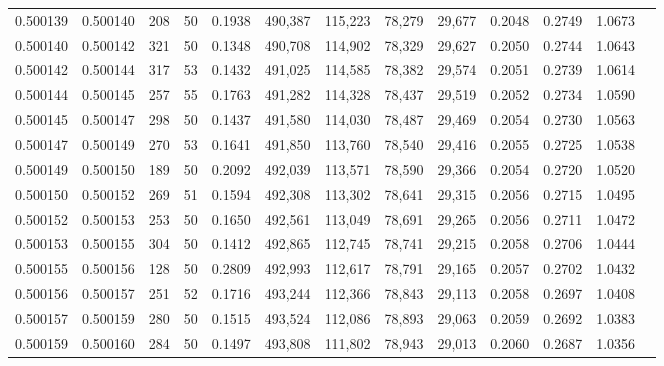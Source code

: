 \begin{tabular}{rrrrrrrrrrrrr}
0.500139 & 0.500140 & 208 &  50 &                                     0.1938 & 490,387 & 115,223 &  78,279 &  29,677 & 0.2048 & 0.2749 & 1.0673 \\
0.500140 & 0.500142 & 321 &  50 &                                     0.1348 & 490,708 & 114,902 &  78,329 &  29,627 & 0.2050 & 0.2744 & 1.0643 \\
0.500142 & 0.500144 & 317 &  53 &                                     0.1432 & 491,025 & 114,585 &  78,382 &  29,574 & 0.2051 & 0.2739 & 1.0614 \\
0.500144 & 0.500145 & 257 &  55 &                                     0.1763 & 491,282 & 114,328 &  78,437 &  29,519 & 0.2052 & 0.2734 & 1.0590 \\
0.500145 & 0.500147 & 298 &  50 &                                     0.1437 & 491,580 & 114,030 &  78,487 &  29,469 & 0.2054 & 0.2730 & 1.0563 \\
0.500147 & 0.500149 & 270 &  53 &                                     0.1641 & 491,850 & 113,760 &  78,540 &  29,416 & 0.2055 & 0.2725 & 1.0538 \\
0.500149 & 0.500150 & 189 &  50 &                                     0.2092 & 492,039 & 113,571 &  78,590 &  29,366 & 0.2054 & 0.2720 & 1.0520 \\
0.500150 & 0.500152 & 269 &  51 &                                     0.1594 & 492,308 & 113,302 &  78,641 &  29,315 & 0.2056 & 0.2715 & 1.0495 \\
0.500152 & 0.500153 & 253 &  50 &                                     0.1650 & 492,561 & 113,049 &  78,691 &  29,265 & 0.2056 & 0.2711 & 1.0472 \\
0.500153 & 0.500155 & 304 &  50 &                                     0.1412 & 492,865 & 112,745 &  78,741 &  29,215 & 0.2058 & 0.2706 & 1.0444 \\
0.500155 & 0.500156 & 128 &  50 &                                     0.2809 & 492,993 & 112,617 &  78,791 &  29,165 & 0.2057 & 0.2702 & 1.0432 \\
0.500156 & 0.500157 & 251 &  52 &                                     0.1716 & 493,244 & 112,366 &  78,843 &  29,113 & 0.2058 & 0.2697 & 1.0408 \\
0.500157 & 0.500159 & 280 &  50 &                                     0.1515 & 493,524 & 112,086 &  78,893 &  29,063 & 0.2059 & 0.2692 & 1.0383 \\
0.500159 & 0.500160 & 284 &  50 &                                     0.1497 & 493,808 & 111,802 &  78,943 &  29,013 & 0.2060 & 0.2687 & 1.0356 \\

\end{tabular}
